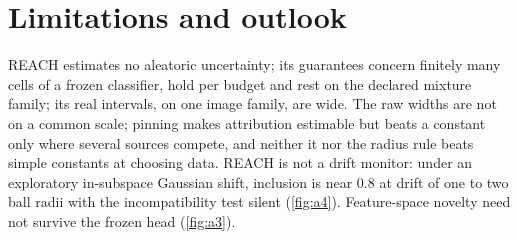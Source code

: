 \section{Limitations and outlook}
\label{sec:limitations}

REACH estimates no aleatoric uncertainty; its guarantees concern finitely many cells of a frozen
classifier, hold per budget and rest on the declared mixture family; its real intervals, on one image
family, are wide. The raw
widths are not on a common scale; pinning makes attribution estimable but beats a constant only where
several sources compete, and neither it nor the radius rule beats simple constants at choosing data. REACH is not a drift monitor: under an exploratory in-subspace Gaussian shift,
inclusion is near $0.8$ at drift of one to two ball radii with the incompatibility test silent
(\cref{fig:a4}). Feature-space novelty need not survive the frozen head (\cref{fig:a3}).

